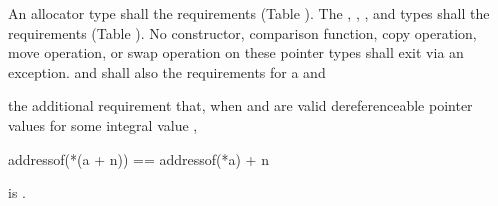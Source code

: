 \setcounter{Paras}{4}
\pnum
An allocator type  shall  the
 requirements (Table ).
The , , , and
 types shall  the
 requirements (Table ).
No constructor,
comparison function, copy operation, move operation, or swap operation on
these pointer types shall exit via an exception.  and  shall also
 the requirements for
a  and
\begin{addedblock}
the additional requirement that, when  and  are
valid dereferenceable pointer values for some integral value ,
\begin{codeblock}
addressof(*(a + n)) == addressof(*a) + n
\end{codeblock}
is .
\end{addedblock}
